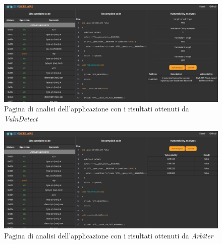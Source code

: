 \documentclass[../main.tex]{subfiles}
\begin{document}
\begin{figure}[H]
    \centering
    \includegraphics[width = \textwidth]{../images/analysis_page_vulndetect.png}
    \caption{Pagina di analisi dell'applicazione con i risultati ottenuti da \textit{VulnDetect}}
\end{figure}
\begin{figure}[H]
    \centering
    \includegraphics[width = \textwidth]{../images/analysis_page_arbiter.png}
    \caption{Pagina di analisi dell'applicazione con i risultati ottenuti da \textit{Arbiter}}
\end{figure}


\newpage


\end{document}
